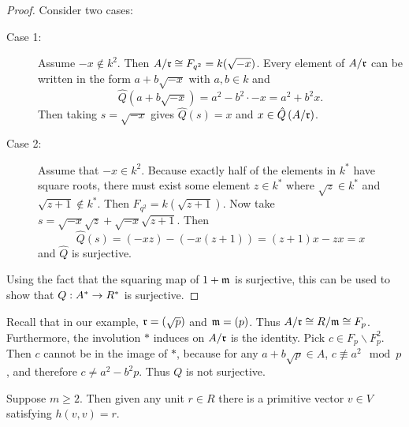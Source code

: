 \begin{proof}
Consider two cases:
\begin{description}
\item[Case 1:] Assume $-x \not\in k^2$. Then $A/\mathfrak{r} \cong F_{q^2} = k(\sqrt{-x})$.
Every element of $A/\mathfrak{r}$ can be written in the form $a + b \sqrt{-x}$ with $a, b \in k$ and 
\[
\hat{Q}(a + b \sqrt{-x}) = a^2 - b^2 \cdot -x = a^2 + b^2x.
\]
Then taking $s = \sqrt{-x}$ gives $\hat{Q}{(s)} = x$ and $x \in \hat{Q}\left(A/\mathfrak{r}\right)$.
\item[Case 2:] Assume that $-x \in k^2$.
Because exactly half of the elements in $k^*$ have square roots, there must exist some element $z \in k^*$ where $\sqrt{z} \in k^*$ and $\sqrt{z+1} \not\in k^*$.
Then $F_{q^2} = k(\sqrt{z+1})$.
Now take $s = \sqrt{-x}\sqrt{z} + \sqrt{-x}\sqrt{z+1}$.
Then
\[
\hat{Q}(s) = (-xz) - (-x(z+1)) = (z+1)x - zx = x
\]
and $\hat{Q}$ is surjective.
\end{description}
Using the fact that the squaring map of $1 + \mathfrak{m}$ is surjective, this can be used to show that $Q: A^* \to R^*$ is surjective.
\end{proof}

\begin{example}\label{ex3.2}
Recall that in our example, $\mathfrak{r} = (\sqrt{p})$ and $\mathfrak{m} = (p)$.
Thus $A/\mathfrak{r} \cong R/\mathfrak{m} \cong F_p$.
Furthermore, the involution $*$ induces on $A/\mathfrak{r}$ is the identity.
Pick $c \in F_p \backslash F_p^2$.
Then $c$ cannot be in the image of $*$, because for any $a + b\sqrt{p} \in A$,
$c \not\equiv a^2 \mod p$, and therefore $c \ne a^2 - b^2 p$.
Thus $Q$ is not surjective.
\end{example}


\begin{proposition}\label{prop3.4}
Suppose $m \ge 2$.
Then given any unit $r \in R$ there is a primitive vector $v \in V$ satisfying $h(v,v) = r$.
\end{proposition}

